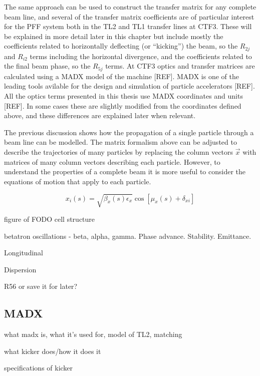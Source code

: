 The same approach can be used to construct the transfer matrix for any complete beam line, and several of the transfer matrix coefficients are of particular interest for the PFF system both in the TL2 and TL1 transfer lines at CTF3. These will be explained in more detail later in this chapter but include mostly the coefficients related to horizontally deflecting (or ``kicking'') the beam, so the \(R_{2j}\) and \(R_{i2}\) terms including the horizontal divergence, and the coefficients related to the final beam phase, so the \(R_{5j}\) terms. At CTF3 optics and transfer matrices are calculated using a MADX model of the machine [REF]. MADX is one of the leading tools avilable for the design and simulation of particle accelerators [REF]. All the optics terms presented in this thesis use MADX coordinates and units [REF]. In some cases these are slightly modified from the coordinates defined above, and these differences are explained later when relevant.

The previous discussion shows how the propagation of a single particle through a beam line can be modelled. The matrix formalism above can be adjusted to describe the trajectories of many particles by replacing the column vectors \(\vec{x}\) with matrices of many column vectors describing each particle. However, to understand the properties of a complete beam it is more useful to consider the equations of motion that apply to each particle. 

\begin{equation}
x_i(s) = \sqrt{\beta_x(s)\epsilon_x}\cos[\mu_x(s) + \delta_{xi}]
\end{equation}

figure of FODO cell structure

betatron oscillations - beta, alpha, gamma. Phase advance. Stability. Emittance.

Longitudinal

Dispersion

R56 or save it for later?

\subsection{MADX}
\label{ss:madx}

what madx is, what it's used for, model of TL2, matching


what kicker does/how it does it

specifications of kicker

